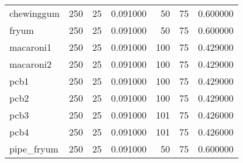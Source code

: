 \begin{tabular}{lrrrrrr}
chewinggum & 250 & 25 & 0.091000 & 50 & 75 & 0.600000 \\
fryum & 250 & 25 & 0.091000 & 50 & 75 & 0.600000 \\
macaroni1 & 250 & 25 & 0.091000 & 100 & 75 & 0.429000 \\
macaroni2 & 250 & 25 & 0.091000 & 100 & 75 & 0.429000 \\
pcb1 & 250 & 25 & 0.091000 & 100 & 75 & 0.429000 \\
pcb2 & 250 & 25 & 0.091000 & 100 & 75 & 0.429000 \\
pcb3 & 250 & 25 & 0.091000 & 101 & 75 & 0.426000 \\
pcb4 & 250 & 25 & 0.091000 & 101 & 75 & 0.426000 \\
pipe_fryum & 250 & 25 & 0.091000 & 50 & 75 & 0.600000 \\
\bottomrule
\end{tabular}

